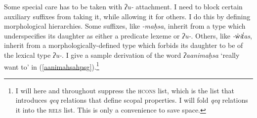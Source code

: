 Some special care has to be taken with \textit{ʔu-} attachment. I need to block certain auxiliary suffixes from taking it, while allowing it for others. I do this by defining morphological hierarchies. Some suffixes, like \textit{-maḥsa}, inherit from a type which underspecifies its daughter as either a predicate lexeme or \textit{ʔu-}. Others, like \textit{-w̓it̓as}, inherit from a morphologically-defined type which forbids its daughter to be of the lexical type \textit{ʔu-}. I give a sample derivation of the word \textit{ʔaanimaḥsa} `really want to' in (\ref{aanimahsahpsg}).\footnote{I will here and throughout suppress the \textsc{hcons} list, which is the list that introduces \textit{qeq} relations that define scopal properties. I will fold \textit{qeq} relations it into the \textsc{rels} list. This is only a convenience to save space.}

